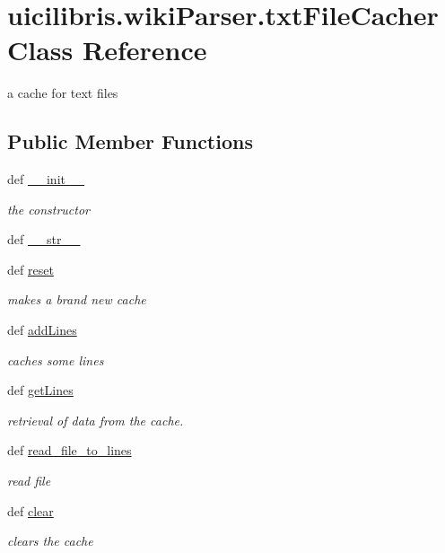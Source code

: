 \hypertarget{classuicilibris_1_1wikiParser_1_1txtFileCacher}{\section{uicilibris.\-wiki\-Parser.\-txt\-File\-Cacher \-Class \-Reference}
\label{classuicilibris_1_1wikiParser_1_1txtFileCacher}
}


a cache for text files  


\subsection*{\-Public \-Member \-Functions}
\begin{DoxyCompactItemize}
\item 
def \hyperlink{classuicilibris_1_1wikiParser_1_1txtFileCacher_a5116017181cf98267f35de960e653377}{\-\_\-\-\_\-init\-\_\-\-\_\-}
\begin{DoxyCompactList}\small\item\em the constructor \end{DoxyCompactList}\item 
def \hyperlink{classuicilibris_1_1wikiParser_1_1txtFileCacher_a664a6a0fed05cedaf2b9dc1fa3320d06}{\-\_\-\-\_\-str\-\_\-\-\_\-}
\item 
def \hyperlink{classuicilibris_1_1wikiParser_1_1txtFileCacher_a5d998aec7fa3c87cb90a5eb12bb71627}{reset}
\begin{DoxyCompactList}\small\item\em makes a brand new cache \end{DoxyCompactList}\item 
def \hyperlink{classuicilibris_1_1wikiParser_1_1txtFileCacher_acd3cbb46f685f35100a5c8ec70e6e153}{add\-Lines}
\begin{DoxyCompactList}\small\item\em caches some lines \end{DoxyCompactList}\item 
def \hyperlink{classuicilibris_1_1wikiParser_1_1txtFileCacher_a5d552058a3ae2a60667b53fd826fb89a}{get\-Lines}
\begin{DoxyCompactList}\small\item\em retrieval of data from the cache. \end{DoxyCompactList}\item 
def \hyperlink{classuicilibris_1_1wikiParser_1_1txtFileCacher_aed9a6f579a83bbfcdcf973af6fe4d3dd}{read\-\_\-file\-\_\-to\-\_\-lines}
\begin{DoxyCompactList}\small\item\em read file \end{DoxyCompactList}\item 
def \hyperlink{classuicilibris_1_1wikiParser_1_1txtFileCacher_aaaf186dd96f7bccc132d10be19316884}{clear}
\begin{DoxyCompactList}\small\item\em clears the cache \end{DoxyCompactList}\end{DoxyCompactItemize}
